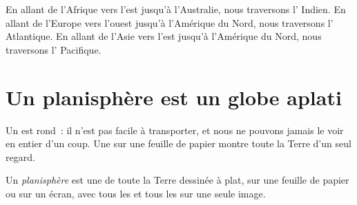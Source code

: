 \begin{example}\label{ex:g3:continents-and-oceans:africa-australia}
En allant de l'Afrique vers l'est jusqu'à l'Australie, nous traversons
l' Indien. En allant de l'Europe vers l'ouest jusqu'à l'Amérique du
Nord, nous traversons l' Atlantique. En allant de l'Asie vers l'est
jusqu'à l'Amérique du Nord, nous traversons l' Pacifique.
\end{example}

\section{Un planisphère est un globe aplati}

Un  est rond~: il n'est pas facile à transporter, et nous ne pouvons
jamais le voir en entier d'un coup. Une  sur une feuille de papier
montre toute la Terre d'un seul regard.

\begin{definition}[Planisphère]\label{def:g3:continents-and-oceans:world-map}
Un \emph{planisphère} est une  de toute
la Terre dessinée à plat, sur une feuille de papier ou sur un écran, avec
tous les  et tous les  sur une seule image.
\end{definition}

